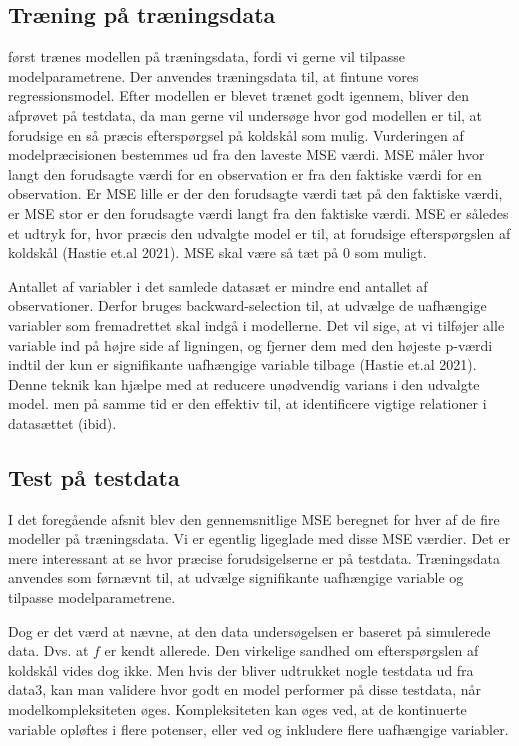 \documentclass[
  12pt,
  a4paper,
  DIV=11,
  numbers=noendperiod,
  oneside,
  open=any]{scrartcl}
\begin{document}
\hypertarget{truxe6ning-puxe5-truxe6ningsdata}{%
\subsection{Træning på
træningsdata}\label{truxe6ning-puxe5-truxe6ningsdata}}

først trænes modellen på træningsdata, fordi vi gerne vil tilpasse
modelparametrene. Der anvendes træningsdata til, at fintune vores
regressionsmodel. Efter modellen er blevet trænet godt igennem, bliver
den afprøvet på testdata, da man gerne vil undersøge hvor god modellen
er til, at forudsige en så præcis efterspørgsel på koldskål som mulig.
Vurderingen af modelpræcisionen bestemmes ud fra den laveste MSE værdi.
MSE måler hvor langt den forudsagte værdi for en observation er fra den
faktiske værdi for en observation. Er MSE lille er der den forudsagte
værdi tæt på den faktiske værdi, er MSE stor er den forudsagte værdi
langt fra den faktiske værdi. MSE er således et udtryk for, hvor præcis
den udvalgte model er til, at forudsige efterspørgslen af koldskål
(Hastie et.al 2021). MSE skal være så tæt på \(0\) som muligt.

Antallet af variabler i det samlede datasæt er mindre end antallet af
observationer. Derfor bruges backward-selection til, at udvælge de
uafhængige variabler som fremadrettet skal indgå i modellerne. Det vil
sige, at vi tilføjer alle variable ind på højre side af ligningen, og
fjerner dem med den højeste p-værdi indtil der kun er signifikante
uafhængige variable tilbage (Hastie et.al 2021). Denne teknik kan hjælpe
med at reducere unødvendig varians i den udvalgte model. men på samme
tid er den effektiv til, at identificere vigtige relationer i datasættet
(ibid).

\hypertarget{test-puxe5-testdata}{%
\subsection{Test på testdata}\label{test-puxe5-testdata}}

I det foregående afsnit blev den gennemsnitlige MSE beregnet for hver af
de fire modeller på træningsdata. Vi er egentlig ligeglade med disse MSE
værdier. Det er mere interessant at se hvor præcise forudsigelserne er
på testdata. Træningsdata anvendes som førnævnt til, at udvælge
signifikante uafhængige variable og tilpasse modelparametrene.

Dog er det værd at nævne, at den data undersøgelsen er baseret på
simulerede data. Dvs. at \(f\) er kendt allerede. Den virkelige sandhed
om efterspørgslen af koldskål vides dog ikke. Men hvis der bliver
udtrukket nogle testdata ud fra data3, kan man validere hvor godt en
model performer på disse testdata, når modelkompleksiteten øges.
Kompleksiteten kan øges ved, at de kontinuerte variable opløftes i flere
potenser, eller ved og inkludere flere uafhængige variabler.
\end{document}
